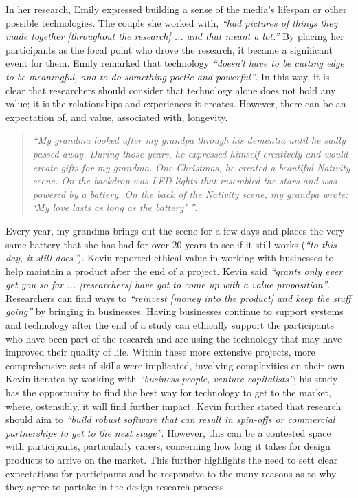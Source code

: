 In her research, Emily expressed building a sense of the media’s lifespan or other possible technologies. The couple she worked with, \textit{``had pictures of things they made together [throughout the research] ... and that meant a lot.''} By placing her participants as the focal point who drove the research, it became a significant event for them. Emily remarked that technology \textit{``doesn’t have to be cutting edge to be meaningful, and to do something poetic and powerful''}. In this way, it is clear that researchers should consider that technology alone does not hold any value; it is the relationships and experiences it creates. However, there can be an expectation of, and value, associated with, longevity. 
\begin{quote}
\textit{``My grandma looked after my grandpa through his dementia until he sadly passed away. During those years, he expressed himself creatively and would create gifts for my grandma. One Christmas, he created a beautiful Nativity scene. On the backdrop was LED lights that resembled the stars and was powered by a battery. On the back of the Nativity scene, my grandpa wrote: `My love lasts as long as the battery' ''}.
\end{quote}

Every year, my grandma brings out the scene for a few days and places the very same battery that she has had for over 20 years to see if it still works (\textit{``to this day, it still does''}). Kevin reported ethical value in working with businesses to help maintain a product after the end of a project. Kevin said \textit{``grants only ever get you so far ... [researchers] have got to come up with a value proposition''}. Researchers can find ways to \textit{``reinvest [money into the product] and keep the stuff going''} by bringing in businesses. Having businesses continue to support systems and technology after the end of a study can ethically support the participants who have been part of the research and are using the technology that may have improved their quality of life. Within these more extensive projects, more comprehensive sets of skills were implicated, involving complexities on their own. Kevin iterates by working with \textit{``business people, venture capitalists''}; his study has the opportunity to find the best way for technology to get to the market, where, ostensibly, it will find further impact. Kevin further stated that research should aim to \textit{``build robust software that can result in spin-offs or commercial partnerships to get to the next stage''}. However, this can be a contested space with participants, particularly carers, concerning how long it takes for design products to arrive on the market. This further highlights the need to sett clear expectations for participants and be responsive to the many reasons as to why they agree to partake in the design research process. 


